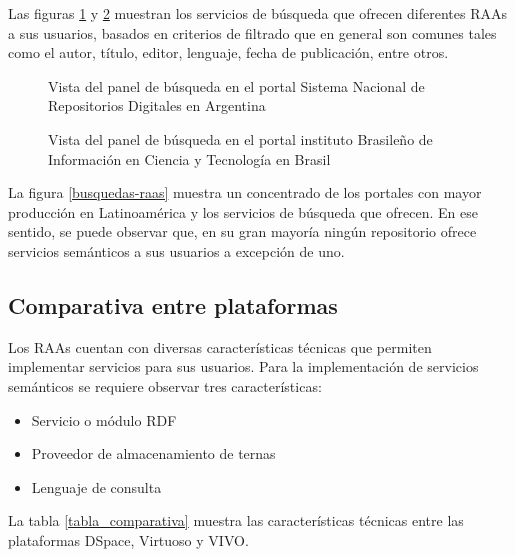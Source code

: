 Las figuras \ref{busquedas-snrd-1} y \ref{busquedas-snrd-2} muestran los servicios de b\'usqueda que ofrecen diferentes RAAs a sus usuarios, basados en criterios de filtrado que en general son comunes tales como el autor, t\'itulo, editor, lenguaje, fecha de publicaci\'on, entre otros.\newline

\begin{figure}[!ht]
	\centering
    \caption{Vista del panel de b\'usqueda en el portal Sistema Nacional de Repositorios Digitales en Argentina} %
    \label{busquedas-snrd-1}
\end{figure}

\begin{figure}[!ht]
	\centering
    \caption{Vista del panel de b\'usqueda en el portal instituto Brasileño de Informaci\'on en Ciencia y Tecnolog\'ia en Brasil} %
    \label{busquedas-snrd-2}
\end{figure}

La figura \ref{busquedas-raas} muestra un concentrado de los portales con mayor producci\'on en Latinoam\'erica y los servicios de b\'usqueda que ofrecen. En ese sentido, se puede observar que, en su gran mayor\'ia ning\'un repositorio ofrece servicios sem\'anticos a sus usuarios a excepci\'on de uno.

\subsection{Comparativa entre plataformas}

Los RAAs cuentan con diversas caracter\'isticas t\'ecnicas que permiten implementar servicios para sus usuarios. Para la implementaci\'on de servicios sem\'anticos se requiere observar tres caracter\'isticas:

\begin{itemize}
    \item Servicio o m\'odulo RDF
    \item Proveedor de almacenamiento de ternas
    \item Lenguaje de consulta
\end{itemize}{}

La tabla \ref{tabla_comparativa} muestra las caracter\'isticas t\'ecnicas entre las plataformas DSpace, Virtuoso y VIVO.


